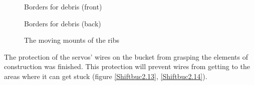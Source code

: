 \begin{figure}[H]
\begin{minipage}[h]{0.47\linewidth}
		\caption{Borders for debris (front)}
		\label{Gripper2.5}
	\end{minipage}
	\hfill
	\begin{minipage}[h]{0.47\linewidth}
		\caption{Borders for debris (back)}
		\label{Gripper2.6}
	\end{minipage}
	\hfill
	\begin{minipage}[h]{0.47\linewidth}
		\caption{The moving mounts of the ribs}
		\label{Elevator3.8}
	\end{minipage}
\end{figure}

The protection of the servos' wires on the bucket from grasping the elements of construction was finished. This protection will prevent wires from getting to the areas where it can get stuck (figure \ref{Shiftbuc2.13}, \ref{Shiftbuc2.14}).

